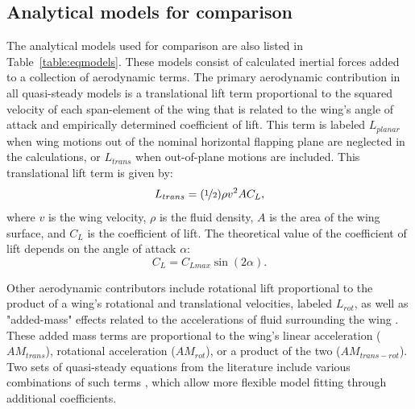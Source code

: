 \documentclass{article}
\begin{document}

\subsection*{Analytical models for comparison}
The analytical models used for comparison are also listed in
Table~\ref{table:eqmodels}.  These models consist of calculated inertial forces
added to a collection of aerodynamic terms.  The primary aerodynamic
contribution in all quasi-steady models is a translational lift term
proportional to the squared velocity of each span-element of the wing that is
related to the wing's angle of attack and empirically determined coefficient of
lift.  This term is labeled $L_{planar}$ when wing motions out of the nominal
horizontal flapping plane are neglected in the calculations, or $L_{trans}$ when
out-of-plane motions are included. This translational lift term is given by:
\begin{equation}
L_{trans}=(\nicefrac{1}{2})\rho v^2AC_L,
\end{equation}
where \(v\) is the wing velocity, \(\rho\) is the fluid density, \(A\) is the area of the wing surface, and \(C_L\) is the coefficient of lift.  The theoretical value of the coefficient of lift depends on the angle of attack \(\alpha\):
\begin{equation}
C_L = C_{Lmax}\sin(2\alpha).
\end{equation}

Other aerodynamic contributors include rotational lift proportional to the
product of a wing's rotational and translational velocities, labeled $L_{rot}$,
as well as "added-mass" effects related to the accelerations of fluid
surrounding the wing \cite{sedov1965two}.  These added mass terms are
proportional to the wing's linear acceleration ($AM_{trans}$), rotational
acceleration ($AM_{rot}$), or a product of the two ($AM_{trans-rot}$).  Two sets
of quasi-steady equations from the literature include various combinations of
such terms \cite{whitney2010aeromechanics,pesavento2004falling}, which allow
more flexible model fitting through additional coefficients.
\end{document}
